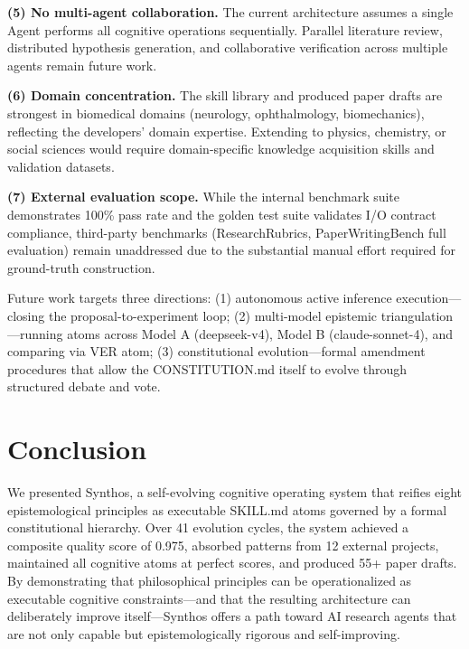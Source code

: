 \documentclass[review]{elsarticle}
\begin{document}
\textbf{(5) No multi-agent collaboration.} The current architecture assumes a single Agent performs all cognitive operations sequentially. Parallel literature review, distributed hypothesis generation, and collaborative verification across multiple agents remain future work.

\textbf{(6) Domain concentration.} The skill library and produced paper drafts are strongest in biomedical domains (neurology, ophthalmology, biomechanics), reflecting the developers' domain expertise. Extending to physics, chemistry, or social sciences would require domain-specific knowledge acquisition skills and validation datasets.

\textbf{(7) External evaluation scope.} While the internal benchmark suite demonstrates 100\% pass rate and the golden test suite validates I/O contract compliance, third-party benchmarks (ResearchRubrics, PaperWritingBench full evaluation) remain unaddressed due to the substantial manual effort required for ground-truth construction.

Future work targets three directions: (1) autonomous active inference execution---closing the proposal-to-experiment loop; (2) multi-model epistemic triangulation---running atoms across Model A (deepseek-v4), Model B (claude-sonnet-4), and comparing via VER atom; (3) constitutional evolution---formal amendment procedures that allow the CONSTITUTION.md itself to evolve through structured debate and vote.

\section{Conclusion}

We presented Synthos, a self-evolving cognitive operating system that reifies eight epistemological principles as executable SKILL.md atoms governed by a formal constitutional hierarchy. Over 41 evolution cycles, the system achieved a composite quality score of 0.975, absorbed patterns from 12 external projects, maintained all cognitive atoms at perfect scores, and produced 55+ paper drafts. By demonstrating that philosophical principles can be operationalized as executable cognitive constraints---and that the resulting architecture can deliberately improve itself---Synthos offers a path toward AI research agents that are not only capable but epistemologically rigorous and self-improving.
\end{document}
